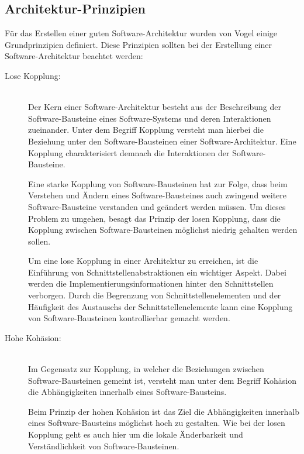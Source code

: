 \subsection{Architektur-Prinzipien\label{subsec2.2.1:Unterunterpunkt-1}}

Für das Erstellen einer guten Software-Architektur wurden von Vogel \cite[S. 128-147]{Vogel.2009} einige Grundprinzipien definiert. Diese Prinzipien sollten bei der Erstellung einer Software-Architektur beachtet werden: \cite[S. 128-147]{Vogel.2009}

\begin{description}
    \item[Lose Kopplung:]\hfill \\
    Der Kern einer Software-Architektur besteht aus der Beschreibung der Software-Bausteine eines Software-Systems und deren Interaktionen zueinander. Unter dem Begriff Kopplung versteht man hierbei die Beziehung unter den Software-Bausteinen einer Software-Architektur. Eine Kopplung charakterisiert demnach die Interaktionen der Software-Bausteine.

    Eine starke Kopplung von Software-Bausteinen hat zur Folge, dass beim Verstehen und Ändern eines Software-Bausteines auch zwingend weitere Software-Bausteine verstanden und geändert werden müssen. Um dieses Problem zu umgehen, besagt das Prinzip der losen Kopplung, dass die Kopplung zwischen Software-Bausteinen möglichst niedrig gehalten werden sollen.

    Um eine lose Kopplung in einer Architektur zu erreichen, ist die Einführung von Schnittstellenabstraktionen ein wichtiger Aspekt. Dabei werden die Implementierungsinformationen hinter den Schnittstellen verborgen. Durch die Begrenzung von Schnittstellenelementen und der Häufigkeit des Austauschs der Schnittstellenelemente kann eine Kopplung von Software-Bausteinen kontrollierbar gemacht werden.

    \item[Hohe Kohäsion:]\hfill \\
    Im Gegensatz zur Kopplung, in welcher die Beziehungen zwischen Software-Bausteinen gemeint ist, versteht man unter dem Begriff Kohäsion die Abhängigkeiten innerhalb eines Software-Bausteins.

    Beim Prinzip der hohen Kohäsion ist das Ziel die Abhängigkeiten innerhalb eines Software-Bausteins möglichst hoch zu gestalten. Wie bei der losen Kopplung geht es auch hier um die lokale Änderbarkeit und Verständlichkeit von Software-Bausteinen.
    

\end{description}
